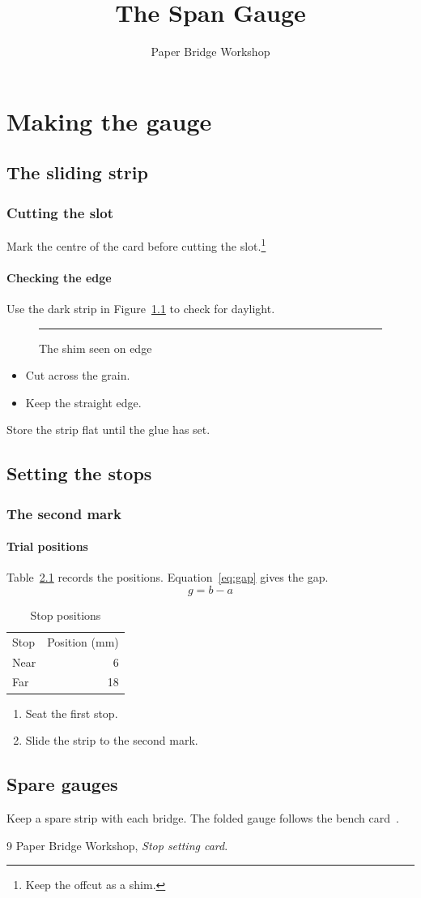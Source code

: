 \documentclass{scrbook}
\title{The Span Gauge}
\author{Paper Bridge Workshop}
\date{}
\begin{document}
\frontmatter
\maketitle
\tableofcontents
\mainmatter
\part{Making the gauge}
\chapter{The sliding strip}
\section{Cutting the slot}
Mark the centre of the card before cutting the slot.\footnote{Keep the offcut as a shim.}
\subsection{Checking the edge}
Use the dark strip in Figure~\ref{fig:shim} to check for daylight.
\begin{figure}[htbp]
\centering\rule{28mm}{3mm}
\caption{The shim seen on edge}\label{fig:shim}
\end{figure}
\begin{itemize}\item Cut across the grain.\item Keep the straight edge.\end{itemize}
\newpage
{}
Store the strip flat until the glue has set.
\chapter{Setting the stops}
\section{The second mark}
\subsection{Trial positions}
Table~\ref{tab:stops} records the positions. Equation~\ref{eq:gap} gives the gap.
\begin{equation}\label{eq:gap}
g=b-a
\end{equation}
\begin{table}[htbp]
\centering\caption{Stop positions}\label{tab:stops}
\begin{tabular}{lr}Stop & Position (mm)\\Near & 6\\Far & 18\end{tabular}
\end{table}
\begin{enumerate}\item Seat the first stop.\item Slide the strip to the second mark.\end{enumerate}
\appendix
\chapter{Spare gauges}
Keep a spare strip with each bridge.
\backmatter
{}
The folded gauge follows the bench card~\cite{card}.
\begin{thebibliography}{9}
 Paper Bridge Workshop, \emph{Stop setting card}.
\end{thebibliography}
\end{document}
